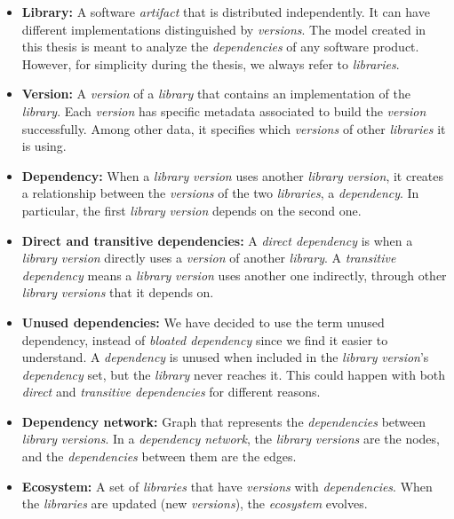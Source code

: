 \begin{itemize}
  \item \textbf{Library:} A software \textit{artifact} that is distributed independently. It can have different implementations distinguished by \textit{versions}. The model created in this thesis is meant to analyze the \textit{dependencies} of any software product. However, for simplicity during the thesis, we always refer to \textit{libraries}.

  \item \textbf{Version:} A \textit{version} of a \textit{library} that contains an implementation of the \textit{library}. Each \textit{version} has specific metadata associated to build the \textit{version} successfully. Among other data, it specifies which \textit{versions} of other \textit{libraries} it is using.

  \item \textbf{Dependency:} When a \textit{library} \textit{version} uses another \textit{library} \textit{version}, it creates a relationship between the \textit{versions} of the two \textit{libraries}, a \textit{dependency}. In particular, the first \textit{library} \textit{version} depends on the second one.

  \item \textbf{Direct and transitive dependencies:} A \textit{direct dependency} is when a \textit{library} \textit{version} directly uses a \textit{version} of another \textit{library}. A \textit{transitive dependency} means a \textit{library} \textit{version} uses another one indirectly, through other \textit{library} \textit{versions} that it depends on.

  \item \textbf{Unused dependencies:} We have decided to use the term unused dependency, instead of \textit{bloated dependency} since we find it easier to understand. A \textit{dependency} is unused when included in the \textit{library} \textit{version}'s \textit{dependency} set, but the \textit{library} never reaches it. This could happen with both \textit{direct} and \textit{transitive dependencies} for different reasons.

  \item \textbf{Dependency network:} Graph that represents the \textit{dependencies} between \textit{library} \textit{versions}. In a \textit{dependency network}, the \textit{library} \textit{versions} are the nodes, and the \textit{dependencies} between them are the edges.

  \item \textbf{Ecosystem:} A set of \textit{libraries} that have \textit{versions} with \textit{dependencies}. When the \textit{libraries} are updated (new \textit{versions}), the \textit{ecosystem} evolves.
\end{itemize}

